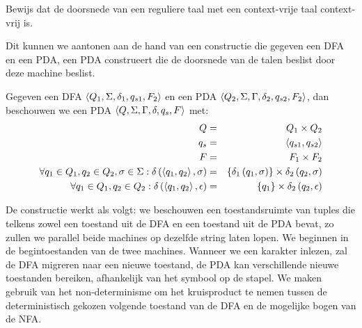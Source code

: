 \documentclass[a4paper]{article}
\begin{document}
\begin{question}
Bewijs dat de doorsnede van een reguliere taal met een context-vrije taal context-vrij is.

\begin{answer}
Dit kunnen we aantonen aan de hand van een constructie die gegeven een DFA en een PDA, een PDA construeert die de doorsnede van de talen beslist door deze machine beslist.
\begin{construction}
Gegeven een DFA $\left\langle Q_1,\Sigma,\delta_1,q_{s1},F_2 \right\rangle$ en een PDA $\left\langle Q_2,\Sigma,\Gamma,\delta_2,q_{s2},F_2 \right\rangle$, dan beschouwen we een PDA $\left\langle Q,\Sigma,\Gamma,\delta,q_s,F \right\rangle$ met:
\begin{eqnarray}
Q&=&Q_1\times Q_2\\
q_s&=&\left\langle q_{s1},q_{s2} \right\rangle\\
F&=&F_1\times F_2\\
\forall q_1\in Q_1,q_2\in Q_2,\sigma\in\Sigma:\delta\left( \left\langle q_1,q_2 \right\rangle,\sigma \right)&=&\left\{ \delta_1\left( q_1,\sigma \right) \right\}\times\delta_2\left( q_2,\sigma \right)\\
\forall q_1\in Q_1,q_2\in Q_2:\delta\left( \left\langle q_1,q_2 \right\rangle,\epsilon \right)&=&\left\{ q_1 \right\}\times\delta_2\left( q_2,\epsilon \right)
\end{eqnarray}
\end{construction}
De constructie werkt als volgt: we beschouwen een toestandsruimte van tuples die telkens zowel een toestand uit de DFA en een toestand uit de PDA bevat, zo zullen we parallel beide machines op dezelfde string laten lopen. We beginnen in de begintoestanden van de twee machines. Wanneer we een karakter inlezen, zal de DFA migreren naar een nieuwe toestand, de PDA kan verschillende nieuwe toestanden bereiken, afhankelijk van het symbool op de stapel. We maken gebruik van het non-determinisme om het kruisproduct te nemen tussen de deterministisch gekozen volgende toestand van de DFA en de mogelijke bogen van de NFA.
\end{answer}
\end{question}
\end{document}
